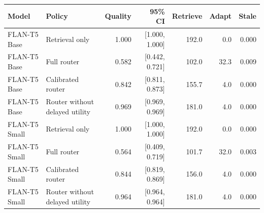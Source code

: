 \begin{tabular}{llrrrrr}
\toprule
Model & Policy & Quality & 95\% CI & Retrieve & Adapt & Stale \\
\midrule
FLAN-T5 Base & Retrieval only & 1.000 & [1.000, 1.000] & 192.0 & 0.0 & 0.000 \\
FLAN-T5 Base & Full router & 0.582 & [0.442, 0.721] & 102.0 & 32.3 & 0.009 \\
FLAN-T5 Base & Calibrated router & 0.842 & [0.811, 0.873] & 155.7 & 4.0 & 0.000 \\
FLAN-T5 Base & Router without delayed utility & 0.969 & [0.969, 0.969] & 181.0 & 4.0 & 0.000 \\
FLAN-T5 Small & Retrieval only & 1.000 & [1.000, 1.000] & 192.0 & 0.0 & 0.000 \\
FLAN-T5 Small & Full router & 0.564 & [0.409, 0.719] & 101.7 & 32.0 & 0.003 \\
FLAN-T5 Small & Calibrated router & 0.844 & [0.819, 0.869] & 156.0 & 4.0 & 0.000 \\
FLAN-T5 Small & Router without delayed utility & 0.964 & [0.964, 0.964] & 181.0 & 4.0 & 0.000 \\
\bottomrule
\end{tabular}
